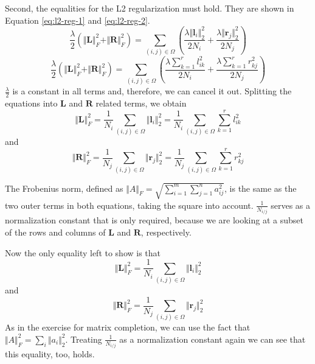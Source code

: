 \documentclass{support/acm_proc_article-sp}
\begin{document}
    Second, the equalities for the L2 regularization must hold.
    They are shown in Equation \ref{eq:l2-reg-1} and \ref{eq:l2-reg-2}.
    \begin{equation}
        \frac{\lambda}{2}(\Vert \mathbf{L} \Vert_F^2 + \Vert \mathbf{R} \Vert_F^2)
        = \sum_{(i,j)\in \Omega} \left( \frac{\lambda \Vert \mathbf{l}_i \Vert_2^2}{2N_i}
            + \frac{\lambda \Vert \mathbf{r}_j \Vert_2^2}{2N_j} \right)
        \label{eq:l2-reg-1}
    \end{equation}
    \begin{equation}
        \frac{\lambda}{2}(\Vert \mathbf{L} \Vert_F^2 + \Vert \mathbf{R} \Vert_F^2)
        = \sum_{(i,j)\in \Omega} \left( \frac{\lambda\sum_{k=1}^r l_{ik}^2}{2N_i}
        + \frac{\lambda\sum_{k=1}^r r_{kj}^2}{2N_j} \right)
        \label{eq:l2-reg-2}
    \end{equation}
    $\frac{\lambda}{2}$ is a constant in all terms and, therefore, we can cancel it out.
    Splitting the equations into $\mathbf{L}$ and $\mathbf{R}$ related terms, we obtain
    \begin{equation*}
        \Vert \mathbf{L} \Vert_F^2
        = \frac{1}{N_i}\sum_{(i,j)\in \Omega} \Vert \mathbf{l}_i \Vert_2^2
        = \frac{1}{N_i}\sum_{(i,j)\in \Omega} \sum_{k=1}^r l_{ik}^2
    \end{equation*}
    and
    \begin{equation*}
        \Vert \mathbf{R} \Vert_F^2
        = \frac{1}{N_j}\sum_{(i,j)\in \Omega} \Vert \mathbf{r}_j \Vert_2^2
        = \frac{1}{N_j}\sum_{(i,j)\in \Omega} \sum_{k=1}^r r_{kj}^2
    \end{equation*}

    The Frobenius norm, defined as $\Vert A\Vert_F = \sqrt{\sum_{i = 1}^m \sum_{j=1}^n a_{ij}^2}$, is the same as
    the two outer terms in both equations, taking the square into account.
    $\frac{1}{N_{i/j}}$ serves as a normalization constant that is only required, because we are looking at a subset of
    the rows and columns of $\mathbf{L}$ and $\mathbf{R}$, respectively.

    Now the only equality left to show is that
    \begin{equation*}
        \Vert \mathbf{L} \Vert_F^2
        = \frac{1}{N_i}\sum_{(i,j)\in \Omega} \Vert \mathbf{l}_i \Vert_2^2
    \end{equation*}
    and
    \begin{equation*}
        \Vert \mathbf{R} \Vert_F^2
        = \frac{1}{N_j}\sum_{(i,j)\in \Omega} \Vert \mathbf{r}_j \Vert_2^2
    \end{equation*}
    As in the exercise for matrix completion, we can use the fact that $\Vert A\Vert_F^2 = \sum_i\Vert a_i\Vert_2^2$.
    Treating $\frac{1}{N_{i/j}}$ as a normalization constant again we can see that this equality, too, holds.
\end{document}
